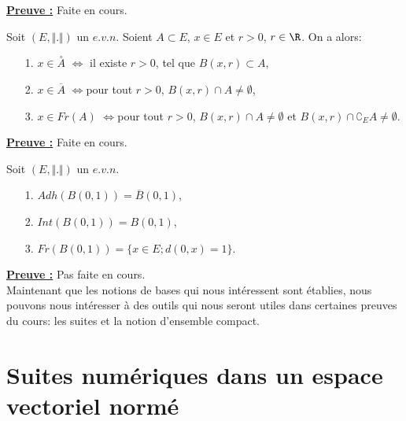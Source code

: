 \documentclass[class=report,crop=false]{standalone}
\begin{document}
\noindent \underline{\bf Preuve :}
Faite en cours.



\begin{proposition}
\textcolor[rgb]{0.50,0.00,0.25}{\vspace{0.1cm}
Soit $(E,\Vert . \Vert)$ un $e.v.n$. Soient $A \subset E$, $x \in E$ et $r>0$, $r\in \R$. On a alors:
 \begin{itemize}
 \item[1.] $x \in \overset{\circ}{A}$ $\Longleftrightarrow $ il existe $r>0$, tel que $B(x,r) \subset A$,
 \item[2.] $x \in \overline{A}$ $\Longleftrightarrow $pour tout $r>0$,  $B(x,r) \cap A \neq \emptyset$,
 \item[3.] $x \in Fr(A)$ $\Longleftrightarrow $pour tout $r>0$,  $B(x,r) \cap A \neq \emptyset$ et $B(x,r) \cap \complement_E A \neq \emptyset$.
 \end{itemize}
}
\end{proposition}



\noindent \underline{\bf Preuve :}
Faite en cours.



\begin{proposition}
\textcolor[rgb]{0.50,0.00,0.25}{\vspace{0.1cm}
Soit $(E,\Vert . \Vert)$ un $e.v.n$.
 \begin{itemize}
 \item[1.] $Adh(B(0,1))=\overline{B}(0,1)$,
 \item[2.] $Int(B(0,1))=B(0,1)$,
 \item[3.] $Fr(B(0,1))=\lbrace x\in E; d(0,x) = 1 \rbrace$.
 \end{itemize}
}
\end{proposition}

\noindent \underline{\bf Preuve :}
Pas faite en cours.\\
$ $\\





\noindent Maintenant que les notions de bases qui nous intéressent sont établies,
nous pouvons nous intéresser à des outils qui nous seront utiles dans certaines preuves du cours: les suites et la notion d'ensemble compact.



\section{Suites numériques dans un espace vectoriel normé}
\end{document}
